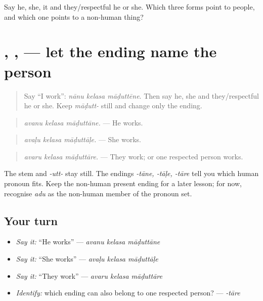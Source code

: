 \begin{tcolorbox}[breakable,colback=teal!4,colframe=teal!35!black,title={Before you move on}]
Say he, she, it and they/respectful he or she. Which three forms point to people, and which one points to a non-human thing?
\end{tcolorbox}
\section[\texorpdfstring{\kn{ಮಾಡುತ್ತಾನೆ} … (māḍuttāne …)}{ಮಾಡುತ್ತಾನೆ … (māḍuttāne …)}]{, ,  — let the ending name the person}

\label{lesson:KA-C12-present-endings}



\begin{quote}
Say “I work”: \emph{nānu kelasa māḍuttēne}. Then say he, she and they/respectful he or she. Keep \emph{māḍutt-} still and change only the ending.
\end{quote}

\begin{grammarlens}[title={Grammar Lens: the ending follows the human pronoun}]
\begin{quote}
\emph{avanu kelasa māḍuttāne.} — He works.
\end{quote}

\begin{quote}
\emph{avaḷu kelasa māḍuttāḷe.} — She works.
\end{quote}

\begin{quote}
\emph{avaru kelasa māḍuttāre.} — They work; or one respected person works.
\end{quote}

The stem and \emph{-utt-} stay still. The endings \emph{-tāne, -tāḷe, -tāre} tell you which human pronoun fits. Keep the non-human present ending for a later lesson; for now, recognise \emph{adu} as the non-human member of the pronoun set.
\end{grammarlens}

\subsection*{Your turn}
\begin{itemize}
\raggedright
  \item \emph{Say it:} “He works” — \emph{avanu kelasa māḍuttāne}
  \item \emph{Say it:} “She works” — \emph{avaḷu kelasa māḍuttāḷe}
  \item \emph{Say it:} “They work” — \emph{avaru kelasa māḍuttāre}
  \item \emph{Identify:} which ending can also belong to one respected person? — \emph{-tāre}
\end{itemize}

